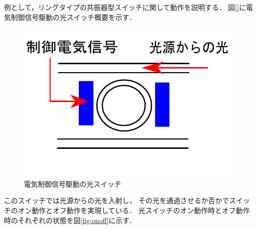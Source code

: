 例として，リングタイプの共振器型スイッチに関して動作を説明する．
図\ref{}に電気制御信号駆動の光スイッチ概要を示す．
\begin{figure}[t!]
 \begin{center}
  \includegraphics[keepaspectratio,scale=0.7]{fig/3/swich6.pdf}
  \caption{電気制御信号駆動の光スイッチ}
  \label{fig:swich6}
 \end{center}
\end{figure}
このスイッチでは光源からの光を入射し，
その光を通過させるか否かでスイッチのオン動作とオフ動作を実現している．
光スイッチのオン動作時とオフ動作時のそれぞれの状態を図\ref{fig:onoff}に示す．
